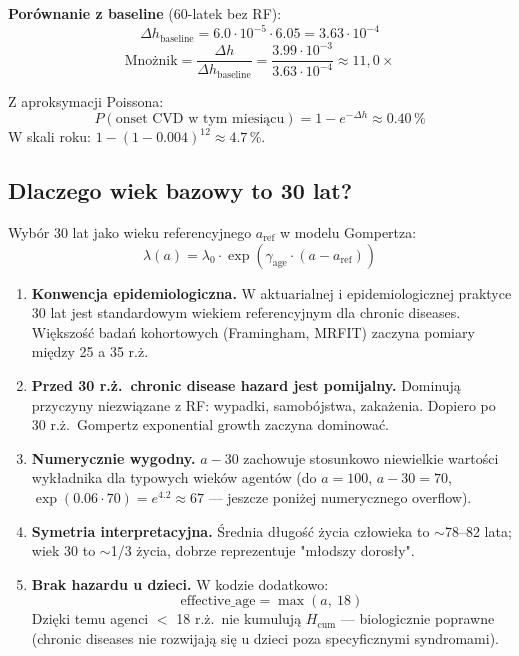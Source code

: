 \documentclass[11pt,a4paper]{article}
\begin{document}
\textbf{Porównanie z baseline} (60-latek bez RF):
\[
\Delta h_{\text{baseline}} = 6.0 \cdot 10^{-5} \cdot 6.05 = 3.63 \cdot 10^{-4}
\]
\[
\text{Mnożnik} = \frac{\Delta h}{\Delta h_{\text{baseline}}} = \frac{3.99 \cdot 10^{-3}}{3.63 \cdot 10^{-4}} \approx 11{,}0\times
\]

Z aproksymacji Poissona:
\[
P(\text{onset CVD w tym miesiącu}) = 1 - e^{-\Delta h} \approx 0.40\,\%
\]
W skali roku: $1 - (1 - 0.004)^{12} \approx 4.7\,\%$.

\subsection{Dlaczego wiek bazowy to 30 lat?}

Wybór 30 lat jako wieku referencyjnego $a_{\text{ref}}$ w modelu Gompertza:
\[
\lambda(a) = \lambda_0 \cdot \exp(\gamma_{\text{age}} \cdot (a - a_{\text{ref}}))
\]

\begin{enumerate}[leftmargin=*, itemsep=4pt]
  \item \textbf{Konwencja epidemiologiczna.} W aktuarialnej i epidemiologicznej praktyce 30 lat jest standardowym wiekiem referencyjnym dla chronic diseases. Większość badań kohortowych (Framingham, MRFIT) zaczyna pomiary między 25 a 35 r.ż.

  \item \textbf{Przed 30 r.ż.\ chronic disease hazard jest pomijalny.} Dominują przyczyny niezwiązane z RF: wypadki, samobójstwa, zakażenia. Dopiero po 30 r.ż.\ Gompertz exponential growth zaczyna dominować.

  \item \textbf{Numerycznie wygodny.} $a - 30$ zachowuje stosunkowo niewielkie wartości wykładnika dla typowych wieków agentów (do $a = 100$, $a - 30 = 70$, $\exp(0.06 \cdot 70) = e^{4.2} \approx 67$ --- jeszcze poniżej numerycznego overflow).

  \item \textbf{Symetria interpretacyjna.} Średnia długość życia człowieka to $\sim$78--82 lata; wiek 30 to $\sim$1/3 życia, dobrze reprezentuje "młodszy dorosły".

  \item \textbf{Brak hazardu u dzieci.} W kodzie dodatkowo:
  \[
  \text{effective\_age} = \max(a,\ 18)
  \]
  Dzięki temu agenci $<$ 18 r.ż.\ nie kumulują $H_{\mathrm{cum}}$ --- biologicznie poprawne (chronic diseases nie rozwijają się u dzieci poza specyficznymi syndromami).
\end{enumerate}
\end{document}
